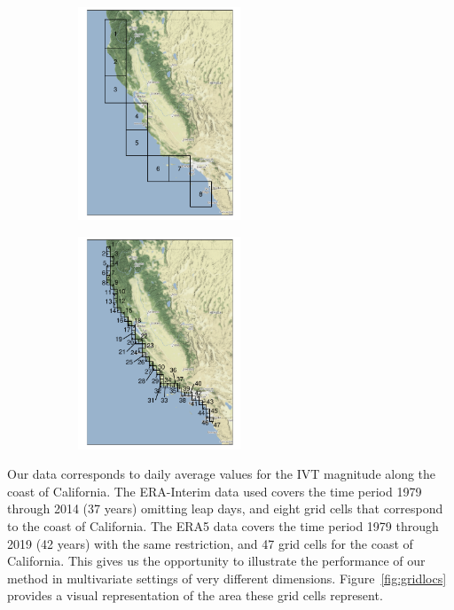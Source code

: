 \begin{figure}[tb]
    \begin{center}
    \caption{Grid cell locations for ERA-Interim (left) and ERA5 (right).\label{fig:gridlocs}}
    \begin{subfigure}[b]{0.48\textwidth}
        \centering 
        \includegraphics[height=2.5in]{./images/erai_grid}
    \end{subfigure}
    \begin{subfigure}[b]{0.48\textwidth}
        \centering
        \includegraphics[height=2.5in]{./images/era5_grid}
    \end{subfigure}
    \end{center}
\end{figure}

Our data corresponds to daily average values for the IVT magnitude
along the coast of California.  The ERA-Interim data used covers the time period 
1979 through 2014 (37 years) omitting leap days, and eight grid cells that correspond to the coast of California.  The ERA5 data
covers the time period 1979 through 2019 (42 years) with the same restriction, and 
47 grid cells for the coast of California.  This gives us the opportunity to illustrate the performance of our method 
in multivariate settings of very different dimensions. Figure~\ref{fig:gridlocs} provides a visual representation of the area these grid cells represent.

